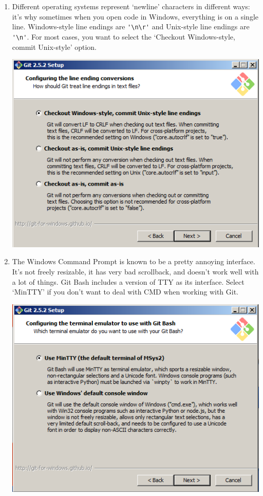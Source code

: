 \documentclass[11pt,fleqn]{article}
\theoremstyle{definition}
\begin{document}
\begin{enumerate}[Step 1.]
\item Different operating systems represent `newline' characters in different
    ways: it's why sometimes when you open code in Windows, everything is on a
    single line. Windows-style line endings are \verb|'\n\r'| and Unix-style
    line endings are \verb|'\n'|. For most cases, you want to select the
    `Checkout Windows-style, commit Unix-style' option.
\begin{center}
\includegraphics[scale=0.6]{gitwininstall3.png}
\end{center}

\item The Windows Command Prompt is known to be a pretty annoying interface.
    It's not freely resizable, it has very bad scrollback, and doesn't work well
    with a lot of things. Git Bash includes a version of TTY as its interface.
    Select `MinTTY' if you don't want to deal with CMD when working with Git.
\begin{center}
\includegraphics[scale=0.6]{gitwininstall4.png}
\end{center}


\end{enumerate}
\end{document}
